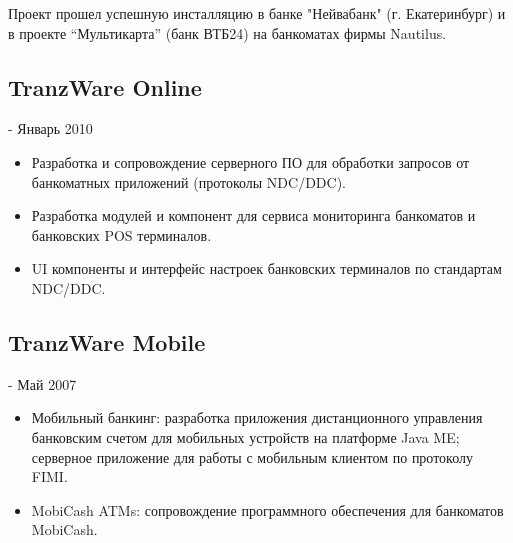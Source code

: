 \documentclass{article}
\begin{document}
Проект прошел успешную инсталляцию в банке "Нейвабанк" (г. Екатеринбург) и в проекте “Мультикарта” (банк ВТБ24) на банкоматах фирмы Nautilus.


\subsection*{TranzWare Online} 
 - Январь 2010
\normalsize
\begin{itemize}
  \item Разработка и сопровождение серверного ПО для обработки запросов от банкоматных приложений (протоколы NDC/DDC).
  \item Разработка модулей и компонент для сервиса мониторинга банкоматов и банковских POS терминалов.
  \item UI компоненты и интерфейс настроек банковских терминалов по стандартам NDC/DDC.
\end{itemize}


\subsection*{TranzWare Mobile}
 - Май 2007
\normalsize
\begin{itemize}
  \item Мобильный банкинг: разработка приложения дистанционного управления банковским счетом для мобильных устройств на платформе Java ME; серверное приложение для работы с мобильным клиентом по протоколу FIMI.
  \item MobiCash ATMs: сопровождение программного обеспечения для банкоматов MobiCash.
\end{itemize}
\end{document}
